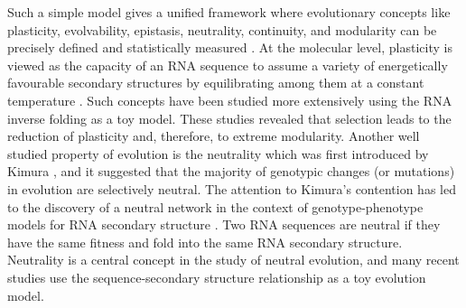 Such a simple model gives a unified framework where evolutionary concepts like plasticity, evolvability, epistasis, neutrality, continuity, and modularity can be precisely defined and statistically measured \cite{fontana1998continuity, ancel2000plasticity}. At the molecular level, plasticity is viewed as the capacity of an RNA sequence to assume a variety of energetically favourable secondary structures by equilibrating among them at a constant temperature \cite{ancel2000plasticity}. Such concepts have been studied more extensively using the RNA inverse folding as a toy model. These studies revealed that selection leads to the reduction of plasticity and, therefore, to extreme modularity. Another well studied property of evolution is the neutrality which was first introduced by Kimura \cite{kimura1983neutral}, and it suggested that the majority of genotypic changes (or mutations) in evolution are selectively neutral. The attention to Kimura's contention has led to the discovery of a neutral network in the context of genotype-phenotype models for  RNA  secondary structure \cite{schuster1994sequences,reidys1997generic}. Two RNA sequences are neutral if they have the same fitness and fold into the same RNA secondary structure. Neutrality is a central concept in the study of neutral evolution, and many recent studies use the sequence-secondary structure relationship as a toy evolution model. 

